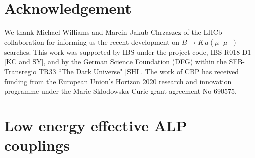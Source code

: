 \documentclass[preprint,prd,aps,tighten,nofootinbib,amssymb]{revtex4}
\begin{document}
\section{Acknowledgement}
We thank Michael Williams and Marcin Jakub Chrzaszcz of the LHCb collaboration for informing us
the recent development on $B\rightarrow K \,a (\mu^+ \mu^-)$ searches.
This work was supported by IBS under the project code, IBS-R018-D1 [KC and SY], and by the German Science Foundation (DFG) within the SFB-Transregio TR33 ``The Dark Universe" [SHI].
The work of CBP has received funding from the European Union’s Horizon 2020 research and innovation programme under the Marie Sklodowska-Curie grant agreement No 690575.


\appendix

\section{Low energy effective ALP couplings} \label{sec:LowEnergyEffectiveALPCouplings}
\end{document}
